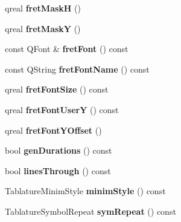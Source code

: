 \begin{DoxyCompactItemize}
\item 
\mbox{\label{class_ms_1_1_staff_type_ab18e24b02182ad3b0a5a48198ba12f65}} 
qreal {\bfseries fret\+MaskH} ()
\item 
\mbox{\label{class_ms_1_1_staff_type_a6afeba2dd48f2311764aa44a87af2223}} 
qreal {\bfseries fret\+MaskY} ()
\item 
\mbox{\label{class_ms_1_1_staff_type_a9e7d3cb818495be085c4397bc858cd96}} 
const Q\+Font \& {\bfseries fret\+Font} () const
\item 
\mbox{\label{class_ms_1_1_staff_type_a701437f8bd29b6adb4ad18a483c91bc2}} 
const Q\+String {\bfseries fret\+Font\+Name} () const
\item 
\mbox{\label{class_ms_1_1_staff_type_a7a10338b1c4d2107fb50dbc25dd2d804}} 
qreal {\bfseries fret\+Font\+Size} () const
\item 
\mbox{\label{class_ms_1_1_staff_type_a160640337eaf6c5b7a59be750073cba6}} 
qreal {\bfseries fret\+Font\+UserY} () const
\item 
\mbox{\label{class_ms_1_1_staff_type_ab60e4b14695bf91190f588920dd2d5f3}} 
qreal {\bfseries fret\+Font\+Y\+Offset} ()
\item 
\mbox{\label{class_ms_1_1_staff_type_ac4addea17875a3cb35d0f57e09b50773}} 
bool {\bfseries gen\+Durations} () const
\item 
\mbox{\label{class_ms_1_1_staff_type_a2e442552f2c65df9eab479beb6ec439f}} 
bool {\bfseries lines\+Through} () const
\item 
\mbox{\label{class_ms_1_1_staff_type_aa6cc928d538e75e4bde3865d515af09e}} 
Tablature\+Minim\+Style {\bfseries minim\+Style} () const
\item 
\mbox{\label{class_ms_1_1_staff_type_a59e7ea71144ca41345f53ad4ff4060e5}} 
Tablature\+Symbol\+Repeat {\bfseries sym\+Repeat} () const

\end{DoxyCompactItemize}
